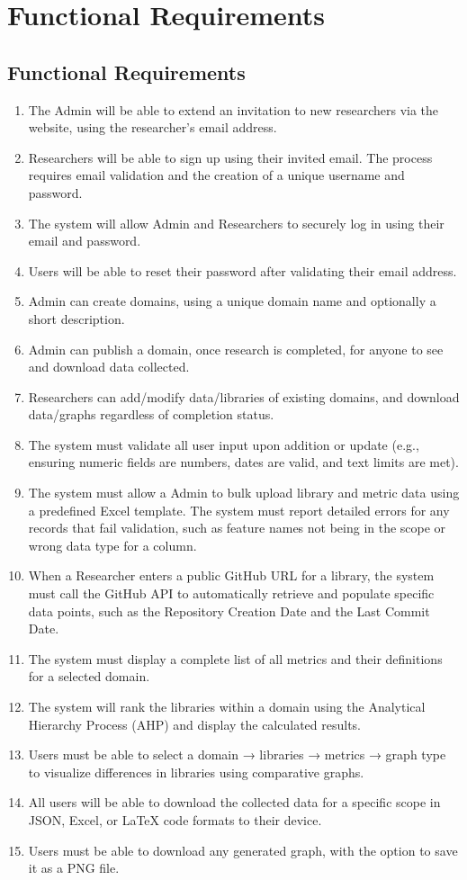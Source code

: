 \documentclass[12pt]{article}
\begin{document}
\section{Functional Requirements}
\subsection{Functional Requirements}
\begin{enumerate}[label=\thesubsection-\arabic*]
  \item The Admin will be able to extend an invitation to new researchers via the website, using the researcher's email address.
  \item Researchers will be able to sign up using their invited email. The process requires email validation and the creation of a unique username and password.
  \item The system will allow Admin and Researchers to securely log in using their email and password.
  \item Users will be able to reset their password after validating their email address.
  \item Admin can create domains, using a unique domain name and optionally a short description.
  \item Admin can publish a domain, once research is completed, for anyone to see and download data collected.
  \item Researchers can add/modify data/libraries of existing domains, and download data/graphs regardless of completion status.
  \item The system must validate all user input upon addition or update (e.g., ensuring numeric fields are numbers, dates are valid, and text limits are met).	
  \item The system must allow a Admin to bulk upload library and metric data using a predefined Excel template. The system must report detailed errors for any records that fail validation, such as feature names not being in the scope or wrong data type for a column.
  \item When a Researcher enters a public GitHub URL for a library, the system must call the GitHub API to automatically retrieve and populate specific data points, such as the Repository Creation Date and the Last Commit Date.
  \item The system must display a complete list of all metrics and their definitions for a selected domain.
  \item The system will rank the libraries within a domain using the Analytical Hierarchy Process (AHP) and display the calculated results.
  \item Users must be able to select a domain → libraries → metrics → graph type to visualize differences in libraries using comparative graphs.
  \item All users will be able to download the collected data for a specific scope in JSON, Excel, or LaTeX code formats to their device.
  \item Users must be able to download any generated graph, with the option to save it as a PNG file.
\end{enumerate}
\end{document}

